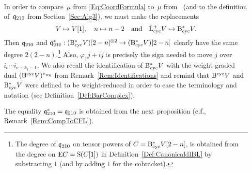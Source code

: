 \documentclass[\MainFolder/Text.tex]{subfiles}
\begin{document}
\begin{Remark}\label{Rem:CompToCFL}
In order to compare~$\mu$ from \eqref{Eq:CoordFormula} to~$\mu$ from~\cite[Section~10]{Cieliebak2015} (and to the definition of~$\mathfrak{q}_{210}$ from Section~\ref{Sec:Alg3}), we must make the replacements
\[ V\mapsto V[1], \quad  n \mapsto n - 2\quad\text{and}\quad\bar{\mathrm{L}}^+_{\mathrm{cyc}} V\mapsto \mathrm{B}_{\mathrm{cyc}}^* V. \]
Then $\mathfrak{q}_{210}$ and $\mathfrak{q}^*_{210}: (\mathrm{B}_{\mathrm{cyc}}^* V)[2-n]^{\otimes 2} \rightarrow (\mathrm{B}_{\mathrm{cyc}}^* V)[2-n]$ clearly have the same degree $2(2-n)$.\footnote{The degree of $\mathfrak{q}_{210}$ on tensor powers of $C = \mathrm{B}_{\mathrm{cyc}}^* V [2-n]$, is obtained from the degree on $\mathrm{E} C = \mathrm{S}(C[1])$ in Definition~\ref{Def:CanonicaldIBL} by substracting $1$ (and by adding $1$ for the cobracket).} Also, $\varphi_1 j + i j$ is precisely the sign needed to move $j$ over $i_{c}\dotsb i_{c+k_1-1}$. We also recall the identification of $\mathrm{B}_{\mathrm{cyc}}^* V$ with the weight-graded dual $(\mathrm{B}^{\mathrm{cyc}} V)^{*_{\mathrm{wg}}}$ from Remark~\ref{Rem:Identifications} and remind that $\mathrm{B}^{\mathrm{cyc}} V$ and $\mathrm{B}_{\mathrm{cyc}}^* V$ were defined to be weight-reduced in order to ease the terminology and notation (see Definition~\ref{Def:BarComplex}).
\end{Remark}

The equality $\mathfrak{q}_{210}^*= \mathfrak{q}_{210}$ is obtained from the next proposition (c.f., Remark~\ref{Rem:CompToCFL}).
\end{document}
